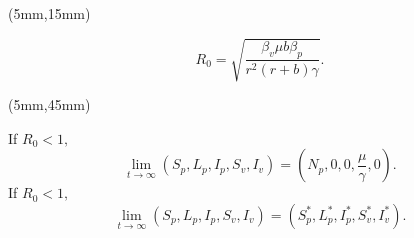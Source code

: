 \documentclass[10pt]{beamer}
\begin{document}
\begin{frame}
	\begin{textblock*}{50mm}(5mm,15mm)
		\begin{greenbox}{}
			\begin{equation*}
				R_0=\sqrt{\frac{\beta_v\mu b\beta_p}{r^2(r+b)\gamma}}.
			\end{equation*}
		\end{greenbox}
	
	\begin{textblock*}{70mm}(5mm,45mm)
		\begin{yellowbox}{}
			If $R_0<1,$
			\begin{equation*}
			\lim\limits_{t\rightarrow \infty}(S_p,L_p,I_p,S_v,I_v)=(N_p,0,0,\frac{\mu}{\gamma},0).
			\end{equation*}
				If $R_0<1,$
			\begin{equation*}
			\lim\limits_{t\rightarrow \infty}(S_p,L_p,I_p,S_v,I_v)=(S_p^*,L_p^*,I_p^*,S_v^*,I_v^*).
			\end{equation*}
		\end{yellowbox}
	\end{textblock*}
	

\end{textblock*}
\end{frame}
\end{document}
